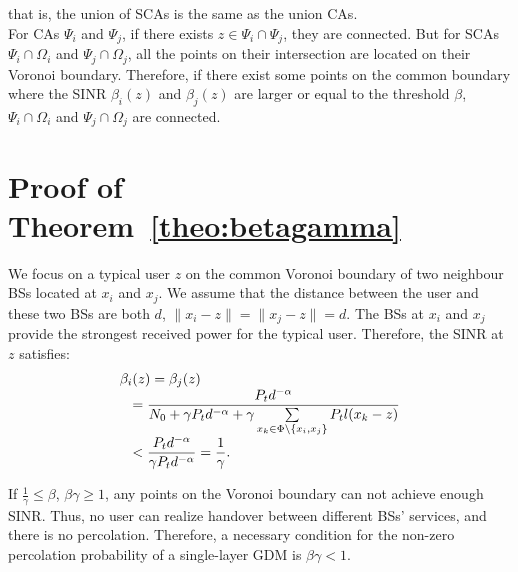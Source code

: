 \documentclass[final]{IEEEtran}
\begin{document}
that is, the union of SCAs is the same as the union CAs.\\ 
\indent For CAs $\Psi_i$ and $\Psi_j$, if there exists $z\in\Psi_i\cap\Psi_j$, they are connected. But for SCAs $\Psi_i\cap\Omega_i$ and $\Psi_j\cap\Omega_j$, all the points on their intersection are located on their Voronoi boundary. Therefore, if there exist some points on the common boundary where the SINR $\beta_i(z)$ and $\beta_j(z)$ are larger or equal to the threshold $\beta$, $\Psi_i\cap\Omega_i$ and $\Psi_j\cap\Omega_j$ are connected.

\section{Proof of Theorem~\ref{theo:betagamma}}\label{app:betagamma}

We focus on a typical user $z$ on the common Voronoi boundary of two neighbour BSs located at $x_i$ and $x_j$. We assume that the distance between the user and these two BSs are both $d$, \ie $\|x_i-z\|=\|x_j-z\|=d$. The BSs at $x_i$ and $x_j$ provide the strongest received power for the typical user. Therefore, the SINR at $z$ satisfies:
\begin{equation}
\begin{array}{r@{}l}
    \beta_i&(z)=\beta_j(z)\\
    &\displaystyle=\frac{P_t d^{-\alpha}}{N_0+\gamma P_t d^{-\alpha} + \gamma\sum\limits_{x_k\in\Phi\backslash \{x_i,x_j\}}P_t l(x_k-z)}\\
    &\displaystyle<\frac{P_t d^{-\alpha}}{\gamma P_t d^{-\alpha}}=\frac{1}{\gamma}.
\end{array}
\end{equation}

\indent If $\frac{1}{\gamma}\leq \beta$, \ie $\beta\gamma\geq 1$, any points on the Voronoi boundary can not achieve enough SINR. Thus, no user can realize handover between different BSs' services, and there is no percolation. Therefore, a necessary condition for the non-zero percolation probability of a single-layer GDM is $\beta\gamma<1$. 
\end{document}
